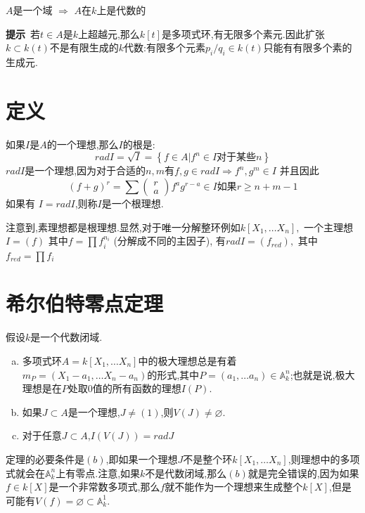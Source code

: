 \documentclass[UTF8]{book}
\begin{document}
		
		\begin{center}
			$ A $是一个域 $\Rightarrow$ $ A $在$ k $上是代数的
		\end{center}
		
		
		\textbf{提示}\ 若$t\in A$是$ k $上超越元,那么$ k[t] $是多项式环,有无限多个素元.因此扩张$k\subset k(t)$不是有限生成的$ k $代数:有限多个元素$p_{i}/q_{i}\in k(t)$只能有有限多个素的生成元.
		
		
	\section{定义}
		如果$ I $是$ A $的一个理想,那么$ I $的根是:
		\begin{equation*}
			rad I =\sqrt{ I }=\left\{ f \in A | f ^{ n } \in I \text {对于某些} n \right\}
		\end{equation*}
		$ rad I  $是一个理想,因为对于合适的$ n,m $有$f, g \in rad I \Rightarrow f^{n}, g^{m} \in I $ 并且因此
		\begin{equation*}
			( f + g )^{ r }=\sum\left(\begin{array}{l}{ r } \\ { a }\end{array}\right) f^{a}g^{r - a} \in I \text {如果} r \geq n + m -1
		\end{equation*}
		如果有 $I= rad I$,则称$ I $是一个根理想.
		
		
		 注意到,素理想都是根理想.显然,对于唯一分解整环例如$k \left[ X _{1}, \ldots X _{ n }\right],$ 一个主理想 $I =( f )$ 其中$f =\prod f _{ i }^{ n _{ i }}$ (分解成不同的主因子), 有$rad I=\left( f _{ red }\right),$ 其中$f _{ red }=\prod f _{ i }$
	
	
	
	\section{希尔伯特零点定理}
		假设$ k $是一个代数闭域.
		\begin{enumerate}[(a)]
			\item 多项式环$A=k \left[X_{1}, \dots X_{n}\right]$中的极大理想总是有着$m_{P}=\left(X_{1}-a_{1}, \ldots X_{n}-a_{n}\right)$的形式,其中$P=\left(a_{1}, \ldots a_{n}\right) \in \mathbb{A}^{n}_{k}$;也就是说,极大理想是在$ P $处取0值的所有函数的理想$ I(P) $.
			\item 如果$J \subset A$是一个理想,$J \neq(1)$,则$V (J ) \neq \varnothing$.
			\item 对于任意$J \subset A$,$ I(V(J)) = rad J$
		\end{enumerate}
		定理的必要条件是$ (b) $,即如果一个理想$ J $不是整个环$ k \left[X_{1}, \dots X_{n}\right] $,则理想中的多项式就会在$ \mathbb{A}^{n}_{k} $上有零点.注意,如果$ k $不是代数闭域,那么$   (b) $就是完全错误的,因为如果$f \in k [ X ]$是一个非常数多项式,那么$ f $就不能作为一个理想来生成整个$ k [ X ] $,但是可能有$ V(f) = \varnothing \subset \mathbb{A}^{1}_{k} $.
		
\end{document}
